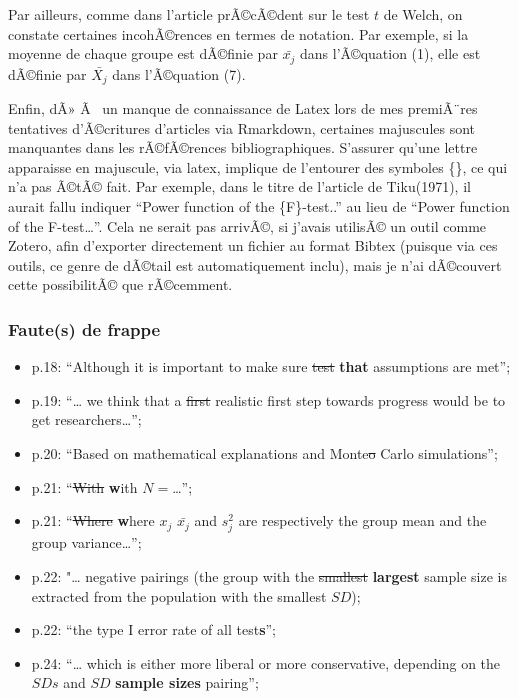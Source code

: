 \begin{appendix}
Par ailleurs, comme dans l'article prÃ©cÃ©dent sur le test \(t\) de
Welch, on constate certaines incohÃ©rences en termes de notation. Par
exemple, si la moyenne de chaque groupe est dÃ©finie par \(\bar{x_j}\)
dans l'Ã©quation (1), elle est dÃ©finie par \(\bar{X_j}\) dans
l'Ã©quation (7).

Enfin, dÃ» Ã~ un manque de connaissance de Latex lors de mes premiÃ¨res
tentatives d'Ã©critures d'articles via Rmarkdown, certaines majuscules
sont manquantes dans les rÃ©fÃ©rences bibliographiques. S'assurer qu'une
lettre apparaisse en majuscule, via latex, implique de l'entourer des
symboles \{\}, ce qui n'a pas Ã©tÃ© fait. Par exemple, dans le titre de
l'article de Tiku(1971), il aurait fallu indiquer ``Power function of
the \{F\}-test..'' au lieu de ``Power function of the F-test\ldots{}''.
Cela ne serait pas arrivÃ©, si j'avais utilisÃ© un outil comme Zotero,
afin d'exporter directement un fichier au format Bibtex (puisque via ces
outils, ce genre de dÃ©tail est automatiquement inclu), mais je n'ai
dÃ©couvert cette possibilitÃ© que rÃ©cemment.

\hypertarget{fautes-de-frappe-1}{%
\subsubsection{Faute(s) de frappe}\label{fautes-de-frappe-1}}

\begin{itemize}
\tightlist
\item
  p.18: ``Although it is important to make sure \sout{test}
  \textbf{that} assumptions are met'';\\
\item
  p.19: ``\ldots{} we think that a \sout{first} realistic first step
  towards progress would be to get researchers\ldots{}'';\\
\item
  p.20: ``Based on mathematical explanations and Monte\sout{o} Carlo
  simulations'';\\
\item
  p.21: ``\sout{With} \textbf{w}ith \(N=\)\ldots{}'';\\
\item
  p.21: ``\sout{Where} \textbf{w}here \sout{\(x_j\)} \(\bar{x_j}\) and
  \(s^2_j\) are respectively the group mean and the group
  variance\ldots{}'';\\
\item
  p.22: "\ldots{} negative pairings (the group with the \sout{smallest}
  \textbf{largest} sample size is extracted from the population with the
  smallest \(SD\));\\
\item
  p.22: ``the type I error rate of all test\textbf{s}'';\\
\item
  p.24: ``\ldots{} which is either more liberal or more conservative,
  depending on the \(SDs\) and \sout{\(SD\)} \textbf{sample sizes}
  pairing'';
\end{itemize}


\end{appendix}

